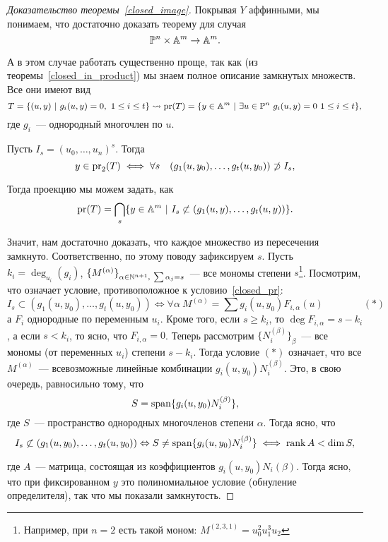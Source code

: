 \begin{proof}[Доказательство теоремы~\ref{closed_image}]
		Покрывая $Y$ аффинными, мы понимаем, что достаточно доказать теорему для случая
		 \[
		 	\mathbb{P}^n \times \mathbb{A}^m \to \mathbb{A}^m.
		 \]

		 А в этом случае работать существенно проще, так как (из теоремы~\ref{closed_in_product}) мы знаем полное описание замкнутых множеств. Все они имеют вид 
		 \[
		 	T = \{ (u, y) \ \vert \ g_i(u, y) = 0, \ 1 \le i \le t \} \rightsquigarrow \mathrm{pr}(T) = \{ y \in \AA^m \ \vert \ \exists u \in \PP^n \ g_i(u, y) = 0 \ 1 \le i \le t \},
		 \]
		 где $g_i$~--- однородный многочлен по $u$. 

		 Пусть $I_{s} = (u_0, \ldots, u_n)^s$. Тогда 
		 \[
		 	y \in \operatorname{pr}_2(T) \iff \forall s \quad (g_{1}(u, y_{0}), \ldots, g_{t}(u, y_{0})) \not\supset I_{s},
		 \]

		 Тогда проекцию мы можем задать, как 
		 \begin{equation}
		 	\mathrm{pr}(T) = \bigcap_{s} \{ y \in \AA^m \ \vert \ I_{s} \not\subset (g_{1}(u, y), \ldots, g_{t}(u, y)) \}. \label{closed_pr}
		 \end{equation}

		 Значит, нам достаточно доказать, что каждое множество из пересечения замкнуто. Соответственно, по этому поводу зафиксируем $s$. Пусть $k_i = \deg_{u_i}(g_{i})$, $\{ M^{(\alpha)}\}_{\alpha \in \N^{n + 1}, \ \sum \alpha_j = s}$~--- все мономы степени $s$\footnote{Например, при $n =2$ есть такой моном: $M^{(2, 3, 1)} = u_0^2 u_1^3 u_2$}. Посмотрим, что означает условие, противоположное к условию~\eqref{closed_pr}:
		 \[
		 	I_{s} \subset (g_{1}(u, y_{0}), \ldots, g_{t}(u, y_{0})) \Leftrightarrow \forall \alpha \  M^{(\alpha)} = \sum g_i(u, y_0) F_{i, \alpha}(u) \quad \quad \quad \quad  (*)
		 \]
		 а $F_i$ однородные по переменным $u_i$. Кроме того, если $s \ge k_i$, то $\deg{F_{i, \alpha}} = s  - k_i$, а если $s < k_i$, то ясно, что $F_{i, \alpha} = 0$. Теперь рассмотрим $\{ N_i^{(\beta)} \}_{\beta}$~--- все мономы (от переменных $u_i$) степени $s - k_i$.  Тогда условие $(*)$ означает, что все $M^{(\alpha)}$~--- всевозможные линейные комбинации $g_i(u, y_0) N_i^{(\beta)}$. Это, в свою очередь, равносильно тому, что 
		 \[
		 	S = \operatorname{span}\{ g_{i}(u, y_0)N_i^{(\beta)} \},
		 \]
		 где $S$~--- пространство однородных многочленов степени $\alpha$. Тогда ясно, что  
		 \[
		 	I_{s} \not\subset (g_{1}(u, y_0), \ldots, g_{t}(u, y_0)) \Leftrightarrow S \neq \operatorname{span}\{ g_{i}(u, y_0)N_i^{(\beta)} \} \iff \operatorname{rank}{A} < \dim{S},
		 \]

		 где $A$~--- матрица, состоящая из коэффициентов $g_i(u, y_0) N_i(\beta)$. Тогда ясно, что при фиксированном $y$ это полиномиальное условие (обнуление определителя), так что мы показали замкнутость. 
	\end{proof}

